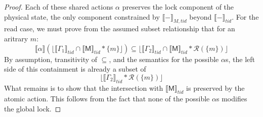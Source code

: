 \begin{proof}
Each of these shared actions $\alpha$ preserves the lock  component of the physical state, the only component constrained by $\llbracket-\rrbracket_{M,tid}$ beyond $\llbracket-\rrbracket_{tid}$.
For the read case, we must prove from the assumed subset relationship that for an aritrary $m$:
\[\llbracket \alpha \rrbracket  (\lfloor \llbracket \Gamma_{1} \rrbracket_{tid}\cap\llbracket\textsf{M}\rrbracket_{tid}  * \{m\} \rfloor )\subseteq  \lfloor \llbracket \Gamma_{2} \rrbracket_{tid}\cap\llbracket\textsf{M}\rrbracket_{tid} * \mathcal{R}(\{m\}) \rfloor\]
By assumption, transitivity of $\subseteq$, and the semantics for the possible $\alpha$s,
the left side of this containment is already a subset of
\[\lfloor \llbracket \Gamma_{2} \rrbracket_{tid} * \mathcal{R}(\{m\}) \rfloor\]
What remains is to show that the intersection with $\llbracket\mathsf{M}\rrbracket_{tid}$ is preserved by the atomic action.
This follows from the fact that none of the possible $\alpha$s modifies the global lock.
\end{proof}

